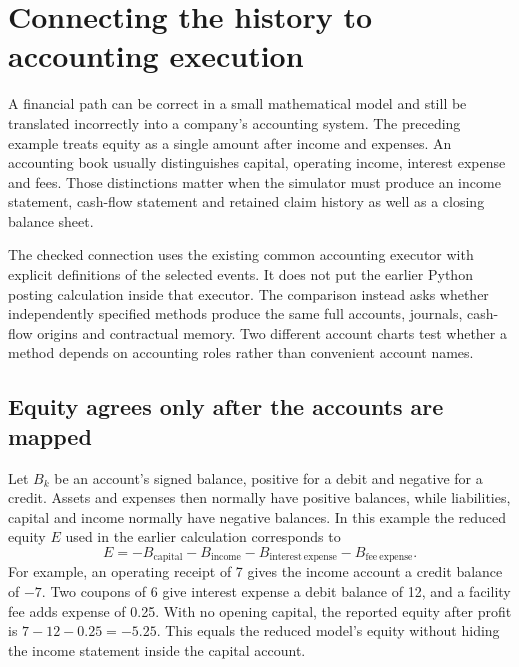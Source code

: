 \section{Connecting the history to accounting execution}
\label{sim:guarded-memory-execution}

A financial path can be correct in a small mathematical model and still be translated incorrectly into a company's accounting system. The preceding example treats equity as a single amount after income and expenses. An accounting book usually distinguishes capital, operating income, interest expense and fees. Those distinctions matter when the simulator must produce an income statement, cash-flow statement and retained claim history as well as a closing balance sheet.

The checked connection uses the existing common accounting executor with explicit definitions of the selected events. It does not put the earlier Python posting calculation inside that executor. The comparison instead asks whether independently specified methods produce the same full accounts, journals, cash-flow origins and contractual memory. Two different account charts test whether a method depends on accounting roles rather than convenient account names.

\subsection{Equity agrees only after the accounts are mapped}

Let $B_k$ be an account's signed balance, positive for a debit and negative for a credit. Assets and expenses then normally have positive balances, while liabilities, capital and income normally have negative balances. In this example the reduced equity $E$ used in the earlier calculation corresponds to
\begin{equation}
 E=-B_{\mathrm{capital}}-B_{\mathrm{income}}
   -B_{\mathrm{interest\ expense}}-B_{\mathrm{fee\ expense}}.
\end{equation}
For example, an operating receipt of 7 gives the income account a credit balance of $-7$. Two coupons of 6 give interest expense a debit balance of 12, and a facility fee adds expense of 0.25. With no opening capital, the reported equity after profit is $7-12-0.25=-5.25$. This equals the reduced model's equity without hiding the income statement inside the capital account.

